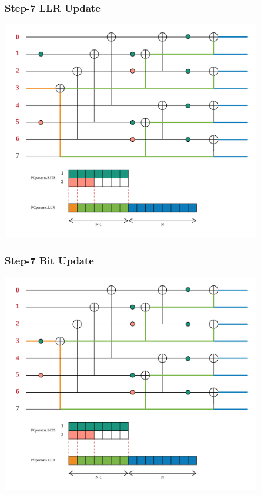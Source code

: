 \documentclass{beamer}
\begin{document}
\begin{frame}
\frametitle{Step-7 LLR Update}
  \begin{center}
  \includegraphics[width=0.85\textwidth]{pics/polar_-_SC_llr_7.png}
  \end{center}
\end{frame}

\begin{frame}
\frametitle{Step-7 Bit Update}
  \begin{center}
  \includegraphics[width=0.85\textwidth]{pics/polar_-_SC_bit_7.png}
  \end{center}
\end{frame}
\end{document}
